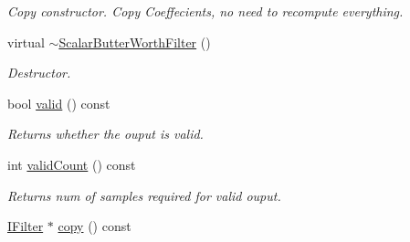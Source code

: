 \begin{DoxyCompactItemize}
\begin{DoxyCompactList}\small\item\em Copy constructor. Copy Coeffecients, no need to recompute everything. \end{DoxyCompactList}\item 
virtual \hyperlink{classow__core_1_1ScalarButterWorthFilter_aa93062001707a171f53f164ad86ba417}{$\sim$\+Scalar\+Butter\+Worth\+Filter} ()\hypertarget{classow__core_1_1ScalarButterWorthFilter_aa93062001707a171f53f164ad86ba417}{}\label{classow__core_1_1ScalarButterWorthFilter_aa93062001707a171f53f164ad86ba417}

\begin{DoxyCompactList}\small\item\em Destructor. \end{DoxyCompactList}\item 
bool \hyperlink{classow__core_1_1ScalarButterWorthFilter_a2a277b564c7379a114cb4fe7ab56fc6b}{valid} () const 
\begin{DoxyCompactList}\small\item\em Returns whether the ouput is valid. \end{DoxyCompactList}\item 
int \hyperlink{classow__core_1_1ScalarButterWorthFilter_abd25951936d5c78f9b4a61f226f0dda6}{valid\+Count} () const 
\begin{DoxyCompactList}\small\item\em Returns num of samples required for valid ouput. \end{DoxyCompactList}\item 
\hyperlink{classow__core_1_1IScalarFilter}{I\+Filter} $\ast$ \hyperlink{classow__core_1_1ScalarButterWorthFilter_a017b55f038e1b6159144708fe1c9f9b1}{copy} () const \hypertarget{classow__core_1_1ScalarButterWorthFilter_a017b55f038e1b6159144708fe1c9f9b1}{}\label{classow__core_1_1ScalarButterWorthFilter_a017b55f038e1b6159144708fe1c9f9b1}


\end{DoxyCompactItemize}
